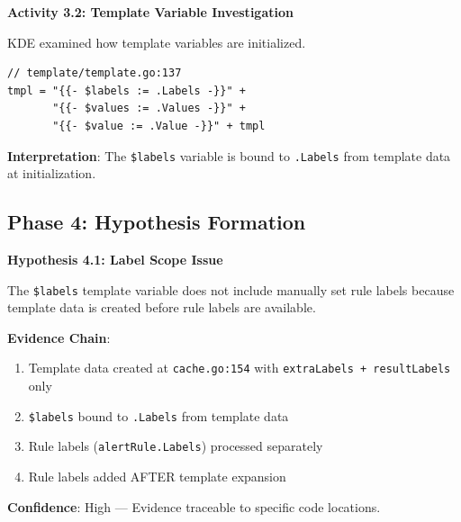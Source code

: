 \documentclass[
    11pt,
    a4paper,
    oneside,
    parskip=full,
    headings=big,
    bibliography=totoc
]{scrartcl}
\newcommand{\code}[1]{\texttt{#1}}
\begin{document}
\begin{actionbox}
    \textbf{Activity 3.2: Template Variable Investigation}
    
    KDE examined how template variables are initialized.
    
    \vspace{0.3cm}
    \begin{evidencebox}
    \begin{verbatim}
// template/template.go:137
tmpl = "{{- $labels := .Labels -}}" + 
       "{{- $values := .Values -}}" + 
       "{{- $value := .Value -}}" + tmpl
    \end{verbatim}
    \end{evidencebox}
    
    \vspace{0.3cm}
    \textbf{Interpretation}: The \code{\$labels} variable is bound to 
    \code{.Labels} from template data at initialization.
\end{actionbox}

\subsection*{Phase 4: Hypothesis Formation}

\begin{actionbox}
    \textbf{Hypothesis 4.1: Label Scope Issue}
    
    The \code{\$labels} template variable does not include manually set rule 
    labels because template data is created before rule labels are available.
    
    \vspace{0.3cm}
    \textbf{Evidence Chain}:
    \begin{enumerate}
        \item Template data created at \code{cache.go:154} with 
              \code{extraLabels + resultLabels} only
        \item \code{\$labels} bound to \code{.Labels} from template data
        \item Rule labels (\code{alertRule.Labels}) processed separately
        \item Rule labels added AFTER template expansion
    \end{enumerate}
    
    \vspace{0.3cm}
    \textbf{Confidence}: High --- Evidence traceable to specific code locations.
\end{actionbox}
\end{document}
